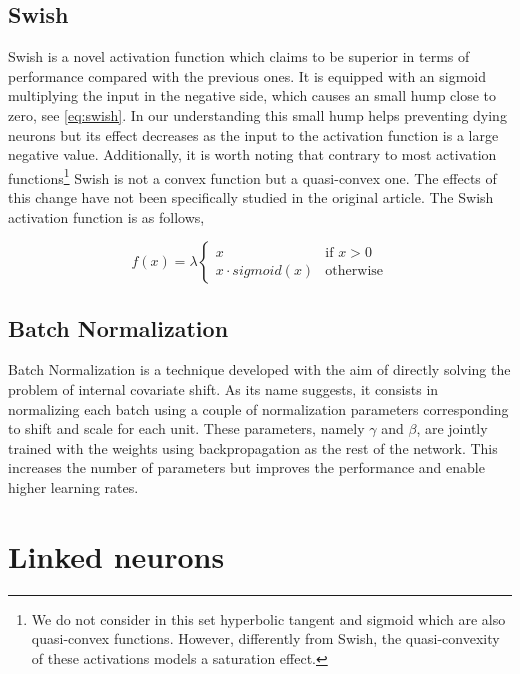 \documentclass[10pt,twocolumn,letterpaper]{article}
\begin{document}
\subsection{Swish}

Swish\cite{swish}  is a novel activation function which claims to be superior in terms of performance compared with the previous ones. It is equipped with an sigmoid multiplying the input in the negative side, which causes an small hump close to zero, see \ref{eq:swish}. In our understanding this small hump helps preventing dying neurons but its effect decreases as the input to the activation function is a large negative value. Additionally, it is worth noting that contrary to most activation functions\footnote{We do not consider in this set hyperbolic tangent and sigmoid which are also quasi-convex functions. However, differently from Swish, the quasi-convexity of these activations models a saturation effect.} Swish is not a convex function but a quasi-convex one. The effects of this change have not been specifically studied in the original article. The Swish activation function is as follows,

\begin{equation}
f(x)=\lambda{\begin{cases}
    x&{\mbox{if }}x>0\\
    x \cdot sigmoid(x) &{\mbox{otherwise}}
    \end{cases}}
\label{eq:swish}
\end{equation}

\subsection{Batch Normalization}

Batch Normalization \cite{batchnorm} is a technique developed with the aim of directly solving the problem of internal covariate shift. As its name suggests, it consists in normalizing each batch using a couple of normalization parameters corresponding to shift and scale for each unit. These parameters, namely $\gamma$ and $\beta$, are jointly trained with the weights using backpropagation as the rest of the network. This increases the number of parameters but improves the performance and enable higher learning rates.

\section{Linked neurons}\label{sec:proposal}
\end{document}

